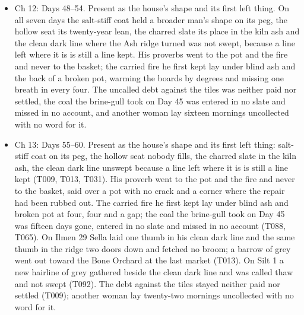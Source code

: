\documentclass{design/chronicle}
\begin{document}
{\begin{itemize}[leftmargin=1.4em,itemsep=1pt,topsep=3pt,parsep=0pt]
\end{itemize}

\begin{itemize}[leftmargin=1.4em,itemsep=1pt,topsep=3pt,parsep=0pt]

\item Ch 12: Days 48–54. Present as the house’s shape and its first left thing. On all seven days the salt-stiff coat held a broader man’s shape on its peg, the hollow seat its twenty-year lean, the charred slate its place in the kiln ash and the clean dark line where the Ash ridge turned was not swept, because a line left where it is is still a line kept. His proverbs went to the pot and the fire and never to the basket; the carried fire he first kept lay under blind ash and the back of a broken pot, warming the boards by degrees and missing one breath in every four. The uncalled debt against the tiles was neither paid nor settled, the coal the brine-gull took on Day 45 was entered in no slate and missed in no account, and another woman lay sixteen mornings uncollected with no word for it.

\end{itemize}

\begin{itemize}[leftmargin=1.4em,itemsep=1pt,topsep=3pt,parsep=0pt]

\item Ch 13: Days 55--60. Present as the house’s shape and its first left thing: salt-stiff coat on its peg, the hollow seat nobody fills, the charred slate in the kiln ash, the clean dark line unswept because a line left where it is is still a line kept (T009, T013, T031). His proverb went to the pot and the fire and never to the basket, said over a pot with no crack and a corner where the repair had been rubbed out. The carried fire he first kept lay under blind ash and broken pot at four, four and a gap; the coal the brine-gull took on Day 45 was fifteen days gone, entered in no slate and missed in no account (T088, T065). On Ilmen 29 Sella laid one thumb in his clean dark line and the same thumb in the ridge two doors down and fetched no broom; a barrow of grey went out toward the Bone Orchard at the last market (T013). On Silt 1 a new hairline of grey gathered beside the clean dark line and was called thaw and not swept (T092). The debt against the tiles stayed neither paid nor settled (T009); another woman lay twenty-two mornings uncollected with no word for it.

\end{itemize}

}
\end{document}
